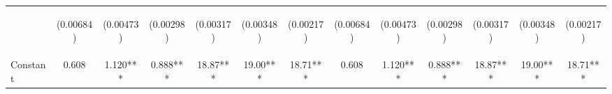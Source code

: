 \documentclass[]{article}
\begin{document}
\begin{center}
\begin{tabular}{lcccccccccccc}
\vspace{4pt} & \begin{footnotesize}(0.00684)\end{footnotesize} & \begin{footnotesize}(0.00473)\end{footnotesize} & \begin{footnotesize}(0.00298)\end{footnotesize} & \begin{footnotesize}(0.00317)\end{footnotesize} & \begin{footnotesize}(0.00348)\end{footnotesize} & \begin{footnotesize}(0.00217)\end{footnotesize} & \begin{footnotesize}(0.00684)\end{footnotesize} & \begin{footnotesize}(0.00473)\end{footnotesize} & \begin{footnotesize}(0.00298)\end{footnotesize} & \begin{footnotesize}(0.00317)\end{footnotesize} & \begin{footnotesize}(0.00348)\end{footnotesize} & \begin{footnotesize}(0.00217)\end{footnotesize} \\
Constant & 0.608 & 1.120*** & 0.888*** & 18.87*** & 19.00*** & 18.71*** & 0.608 & 1.120*** & 0.888*** & 18.87*** & 19.00*** & 18.71*** \\

\end{tabular}
\end{center}
\end{document}

